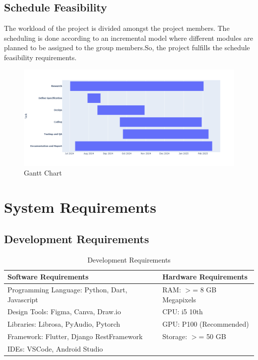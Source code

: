 \subsection{Schedule Feasibility}
The workload of the project is divided amongst the project members. The
scheduling is done according to an incremental model where different modules
are planned to be assigned to the group members.So, the project fulfills the
schedule feasibility requirements.
\begin{figure}[h]
    \centering
    \includegraphics[scale=0.4]{images/gantt_chart.png}
    \caption{Gantt Chart}\label{fig:my_label}
\end{figure}
\newpage
\section{System Requirements}

\subsection{Development Requirements}
\begin{table}[h]
    \centering
    \caption{Development Requirements}
    \begin{tabular}{|l|l|}
        \hline
        \textbf{Software Requirements}                 & \textbf{Hardware
        Requirements}                                                          \\ \hline
        Programming Language: Python, Dart, Javascript & RAM: \(>\)= 8 GB
        Megapixels                                                             \\ \hline
        Design Tools: Figma, Canva, Draw.io            & CPU: i5 10th
        \\ \hline
        Libraries: Librosa, PyAudio, Pytorch           & GPU: P100
        (Recommended)                                                          \\ \hline
        Framework: Flutter, Django RestFramework       & Storage: \(>\)= 50 GB
        \\ \hline
        IDEs: VSCode, Android Studio                   &
        \\ \hline
    \end{tabular}
\end{table}

